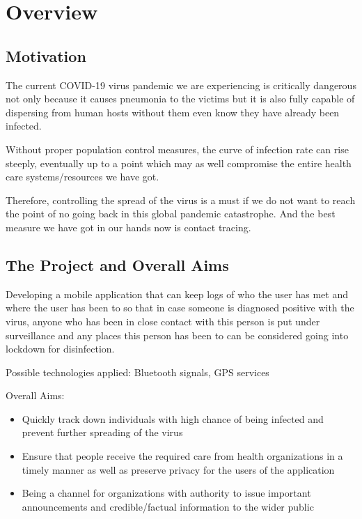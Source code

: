 \section{Overview}
  \subsection{Motivation}
    \par The current COVID-19 virus pandemic we are experiencing is critically dangerous not only because it causes pneumonia to the victims but it is also fully capable of dispersing from human hosts without them even know they have already been infected.
    \par Without proper population control measures, the curve of infection rate can rise steeply, eventually up to a point which may as well compromise the entire health care systems/resources we have got.
    \par Therefore, controlling the spread of the virus is a must if we do not want to reach the point of no going back in this global pandemic catastrophe. And the best measure we have got in our hands now is contact tracing.
  \subsection{The Project and Overall Aims}
    \par Developing a mobile application that can keep logs of who the user has met and where the user has been to so that in case someone is diagnosed positive with the virus, anyone who has been in close contact with this person is put under surveillance and any places this person has been to can be considered going into lockdown for disinfection.
    \par Possible technologies applied: Bluetooth signals, GPS services
    \par Overall Aims:
    \begin{itemize}
      \item Quickly track down individuals with high chance of being infected and prevent further spreading of the virus
      \item Ensure that people receive the required care from health organizations in a timely manner as well as preserve privacy for the users of the application
      \item Being a channel for organizations with authority to issue important announcements and credible/factual information to the wider public
    \end{itemize}

